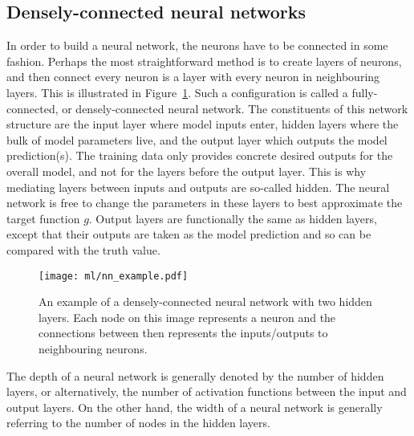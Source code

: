 \documentclass[main.tex]{subfiles}
\begin{document}
\subsection{Densely-connected neural networks}
    In order to build a neural network, the neurons
    have to be connected in some fashion. Perhaps
    the most straightforward method is to create
    layers of neurons, and then connect every neuron
    is a layer with every neuron in neighbouring layers.
    This is illustrated in Figure~\ref{fig:nn_example}.
    Such a configuration is called a fully-connected,
    or densely-connected neural network. The constituents
    of this network structure are the input layer where
    model inputs enter, hidden layers where the bulk of
    model parameters live, and the
    output layer which outputs the model prediction(s).
    The training data only provides concrete desired
    outputs for the overall model, and not for the layers
    before the output layer. This is why mediating layers
    between inputs and outputs are so-called hidden.
    The neural network is free to change the parameters
    in these layers to best approximate the target function
    $g$.
    Output layers are functionally the same as hidden
    layers, except that their outputs are taken as the
    model prediction and so can be compared with the truth
    value.
    
    \begin{figure}
        \texttt{[image: ml/nn\_example.pdf]}
        \caption{An example of a densely-connected
        neural network with two hidden layers.
        Each node on this image represents
        a neuron and the connections between then
        represents the inputs/outputs to neighbouring neurons.}
        \label{fig:nn_example}
    \end{figure}

    The depth of a neural network
    is generally denoted by the number of hidden layers,
    or alternatively, the number of activation functions
    between the input and output layers. On the other hand,
    the width of a neural network is generally referring
    to the number of nodes in the hidden layers.
\end{document}
